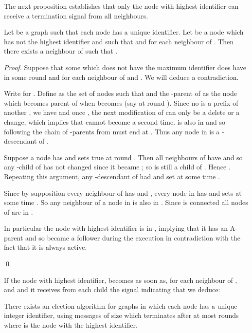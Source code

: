 \documentclass[11pt,envcountsame,letterpaper]{llncs}
\begin{document}
The next proposition
establishes
that only the node with highest identifier
can receive a termination signal from all neighbours.

\begin{proposition}\label{prop:term}
Let  be a graph such that each node has a unique identifier.
Let  be a node which has not the highest identifier and 
such that  and for each neighbour  of 
. Then there exists a neighbour  of  such that 
.
\end{proposition}

\begin{proof}
Suppose that some  which does not have the maximum identifier
does have in some round  and for each neighbour  of 
 and . We will deduce a contradiction.

Write  for .
Define  as the set of nodes  such that 
and the -parent of  as the node  which becomes
parent of  when  becomes  (say at round ).
Since no  is a prefix of another ,
we have  and
once , the next modification of  can only be a delete or a change,
which implies that  cannot become  a second time.
 is also in  and so following the chain of
-parents from  must end at .
Thus any node in  is a -descendant of .

Suppose a node  has  and sets  true at round . Then all
neighbours of  have  and so any -child 
of  has not changed
 since it became ; so  is still a child of .
Hence .
Repeating this argument, any -descendant of  had  and
set  at some time .

Since by supposition every neighbour  of  has  and , 
every node in 
has  and
sets  at some time . So any neighbour of a node
in  is also in . Since  is connected all nodes of 
are in .

In particular the node with highest identifier is in ,
implying that it has an A-parent and so became a follower during the execution
in contradiction with the fact that it is always active.

\qed
\end{proof}
If the node  with highest identifier, 
 becomes  as soon as, for each neighbour  of , 
  and  
and it receives 
from each child   the signal 
indicating that  we deduce:

\begin{theorem}
\label{th:main}
There exists an election algorithm for graphs 
in which each node has a unique integer identifier, using
messages of size  which terminates
after at most  rounds
where  is the node with the highest identifier.
\end{theorem}
\end{document}
